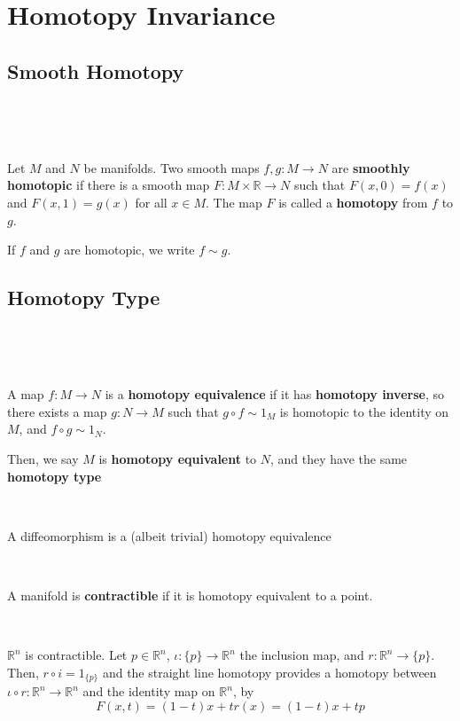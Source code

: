 \documentclass{article}
\begin{document}
\section{Homotopy Invariance}

\subsection{Smooth Homotopy}
\

\begin{definition}
\

Let $M$ and $N$ be manifolds. Two smooth maps $f, g: M \to N$ are \textbf{smoothly homotopic} if there is a smooth map $F: M \times \mathbb{R} \to N$ such that $F(x, 0) = f(x)$ and $F(x,1) = g(x)$ for all $x \in M$. The map $F$ is called a \textbf{homotopy} from $f$ to $g$.

If $f$ and $g$ are homotopic, we write $f \sim g$.
\end{definition}

\subsection{Homotopy Type}
\

\begin{definition}
\

A map $f: M \to N$ is a \textbf{homotopy equivalence} if it has \textbf{homotopy inverse}, so there exists a map $g: N \to M$ such that $g\circ f \sim 1_M$ is homotopic to the identity on $M$, and $f \circ g \sim 1_N$.

Then, we say $M$ is \textbf{homotopy equivalent} to $N$, and they have the same \textbf{homotopy type}  
\end{definition}

\begin{example}
\

A diffeomorphism is a (albeit trivial) homotopy equivalence
\end{example}

\begin{definition}
\

A manifold is \textbf{contractible} if it is homotopy equivalent to a point. 
\end{definition}

\begin{example}
\

$\mathbb{R}^n$ is contractible. Let $p \in \mathbb{R}^n$, $\iota: \{p \} \to \mathbb{R}^n$ the inclusion map, and $r: \mathbb{R}^n \to\{p\}$. Then, $r \circ i = 1_{\{p\}}$ and the straight line homotopy provides a homotopy between $\iota \circ r: \mathbb{R}^n \to \mathbb{R}^n$ and the identity map on $\mathbb{R}^n$, by $$F(x,t) = (1-t)x + tr(x) = (1-t)x + tp$$
\end{example}
\end{document}
